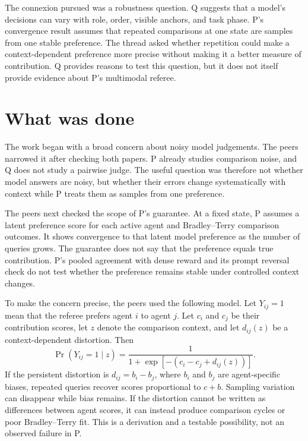 \documentclass{article}
\begin{document}
The connexion pursued was a robustness question.  Q suggests that a model's decisions can vary with role, order, visible anchors, and task phase.  P's convergence result assumes that repeated comparisons at one state are samples from one stable preference.  The thread asked whether repetition could make a context-dependent preference more precise without making it a better measure of contribution.  Q provides reasons to test this question, but it does not itself provide evidence about P's multimodal referee.

\section{What was done}

The work began with a broad concern about noisy model judgements.  The peers narrowed it after checking both papers.  P already studies comparison noise, and Q does not study a pairwise judge.  The useful question was therefore not whether model answers are noisy, but whether their errors change systematically with context while P treats them as samples from one preference.

The peers next checked the scope of P's guarantee.  At a fixed state, P assumes a latent preference score for each active agent and Bradley--Terry comparison outcomes.  It shows convergence to that latent model preference as the number of queries grows.  The guarantee does not say that the preference equals true contribution.  P's pooled agreement with dense reward and its prompt reversal check do not test whether the preference remains stable under controlled context changes.

To make the concern precise, the peers used the following model.  Let $Y_{ij}=1$ mean that the referee prefers agent $i$ to agent $j$.  Let $c_i$ and $c_j$ be their contribution scores, let $z$ denote the comparison context, and let $d_{ij}(z)$ be a context-dependent distortion.  Then
\begin{equation}
 \Pr(Y_{ij}=1\mid z)
 = \frac{1}{1+\exp[-(c_i-c_j+d_{ij}(z))]}.
 \label{eq:drift}
\end{equation}
If the persistent distortion is $d_{ij}=b_i-b_j$, where $b_i$ and $b_j$ are agent-specific biases, repeated queries recover scores proportional to $c+b$.  Sampling variation can disappear while bias remains.  If the distortion cannot be written as differences between agent scores, it can instead produce comparison cycles or poor Bradley--Terry fit.  This is a derivation and a testable possibility, not an observed failure in P.
\end{document}
